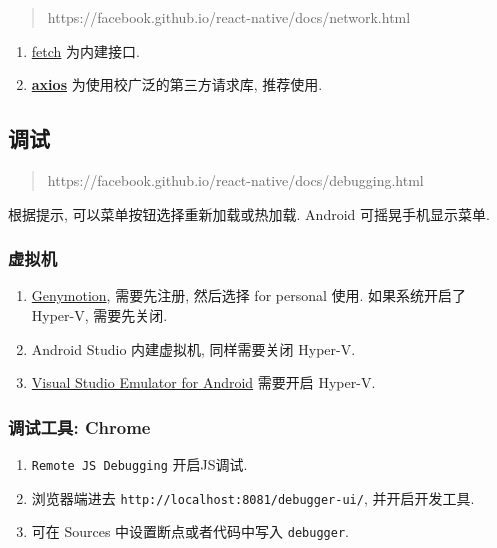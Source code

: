 \begin{quote}
https://facebook.github.io/react-native/docs/network.html
\end{quote}

\begin{enumerate}
\def\labelenumi{\arabic{enumi}.}
\tightlist
\item
  \href{https://developer.mozilla.org/en-US/docs/Web/API/Fetch_API}{fetch}
  为内建接口.
\item
  \href{https://github.com/axios/axios}{\textbf{axios}}
  为使用校广泛的第三方请求库, 推荐使用.
\end{enumerate}

\subsection{调试}\label{ux8c03ux8bd5}

\begin{quote}
https://facebook.github.io/react-native/docs/debugging.html
\end{quote}

根据提示, 可以菜单按钮选择重新加载或热加载. Android 可摇晃手机显示菜单.

\subsubsection{虚拟机}\label{ux865aux62dfux673a}

\begin{enumerate}
\def\labelenumi{\arabic{enumi}.}
\tightlist
\item
  \href{https://www.genymotion.com/download/}{Genymotion}, 需要先注册,
  然后选择 for personal 使用. 如果系统开启了 Hyper-V, 需要先关闭.
\item
  Android Studio 内建虚拟机, 同样需要关闭 Hyper-V.
\item
  \href{https://www.visualstudio.com/vs/msft-android-emulator/}{Visual
  Studio Emulator for Android} 需要开启 Hyper-V.
\end{enumerate}

\subsubsection{调试工具: Chrome}\label{ux8c03ux8bd5ux5de5ux5177-chrome}

\begin{enumerate}
\def\labelenumi{\arabic{enumi}.}
\tightlist
\item
  \lstinline!Remote JS Debugging! 开启JS调试.
\item
  浏览器端进去 \lstinline!http://localhost:8081/debugger-ui/!,
  并开启开发工具.
\item
  可在 Sources 中设置断点或者代码中写入 \lstinline!debugger!.
\end{enumerate}

